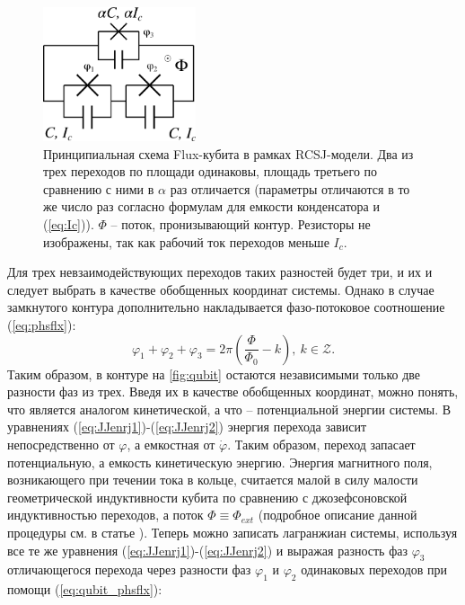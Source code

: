 \documentclass[12pt, twoside]{report}
\numberwithin{equation}{section}
\numberwithin{figure}{section}
\begin{document}
\iffalse
\begin{figure}
\centering
\includegraphics[width=0.4\textwidth]{Pictures/qubit}
\caption{Принципиальная схема Flux-кубита в рамках RCSJ-модели. Два из трех переходов по площади одинаковы, площадь третьего по сравнению с ними в $\alpha$ раз отличается (параметры отличаются в то же число раз согласно формулам для емкости конденсатора и (\ref{eq:Ic})). $\Phi$ -- поток, пронизывающий контур. Резисторы не изображены, так как рабочий ток переходов меньше $I_c$.}
\label{fig:qubit}
\end{figure}
Для трех невзаимодействующих переходов таких разностей будет три, и их и следует выбрать в качестве обобщенных координат системы. Однако в случае замкнутого контура дополнительно накладывается фазо-потоковое соотношение (\ref{eq:phsflx}):
\begin{equation}
\varphi_1 + \varphi_2 + \varphi_3 = 2\pi\left(\frac{\Phi}{\Phi_0} - k\right),\ k\in \mathcal{Z}.
\label{eq:qubit_phsflx}
\end{equation}
Таким образом, в контуре на \autoref{fig:qubit} остаются независимыми только две разности фаз из трех. Введя их в качестве обобщенных координат, можно понять, что является аналогом кинетической, а что -- потенциальной энергии системы. В уравнениях (\ref{eq:JJenrj1})-(\ref{eq:JJenrj2}) энергия перехода зависит непосредственно от $\varphi$, а емкостная от $\dot \varphi$. Таким образом, переход запасает потенциальную, а емкость кинетическую энергию. Энергия магнитного поля, возникающего при течении тока в кольце, считается малой в силу малости геометрической индуктивности кубита по сравнению с джозефсоновской индуктивностью переходов, а поток $\Phi \equiv \Phi_{ext}$ (подробное описание данной процедуры см. в статье \cite{Robertson2006}). Теперь можно записать лагранжиан системы, используя все те же уравнения (\ref{eq:JJenrj1})-(\ref{eq:JJenrj2}) и выражая разность фаз $\varphi_3$ отличающегося перехода через разности фаз $\varphi_1$ и $\varphi_2$ одинаковых переходов при помощи (\ref{eq:qubit_phsflx}):
\end{document}
